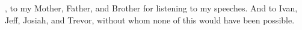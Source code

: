 
, to my Mother, Father, and Brother for listening to my speeches. And to Ivan, Jeff, Josiah, and Trevor, without whom none of this would have been possible.